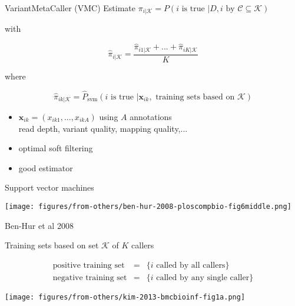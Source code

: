 \documentclass{beamer} %
\begin{document}
\begin{frame}{VariantMetaCaller (VMC)}
Estimate
\(\pi_{i|\mathcal{K}} = P(i \text{ is true } | D, i \text{ by }
\mathcal{C}\subseteq\mathcal{K})\)
\bigskip

with

\[\hat{\pi}_{i | \mathcal{K}} = \frac{\hat{\pi}_{i1 | \mathcal{K}} + ... +
\hat{\pi}_{iK | \mathcal{K}}}{K}\]

where

\[\hat{\pi}_{ik | \mathcal{K}} = \hat{P}_{\text{svm}}(i \text{ is true } |
\mathbf{x}_{ik}, \text{ training sets based on } \mathcal{K})\]
\begin{itemize}
\item \(\mathbf{x}_{ik} = (x_{ik1},...,x_{ikA})\) using \(A\) annotations \\
{\small read depth, variant quality, mapping quality,...}
\item optimal soft filtering
\item good estimator 
\end{itemize}
\end{frame}

\begin{frame}{Support vector machines}
\begin{center}
\texttt{[image: figures/from-others/ben-hur-2008-ploscompbio-fig6middle.png]}

\end{center}
{\footnotesize Ben-Hur et al 2008}
\end{frame}


\begin{frame}{Training sets based on set \(\mathcal{K}\) of \(K\) callers}
\begin{center}
\begin{eqnarray*}
\text{positive training set} &=& \{i \text{ called by all callers}\} \\
\text{negative training set} &=& \{i \text{ called by any single caller}\}
\end{eqnarray*}
\bigskip

\texttt{[image: figures/from-others/kim-2013-bmcbioinf-fig1a.png]}
\end{center}
\end{frame}
\end{document}
